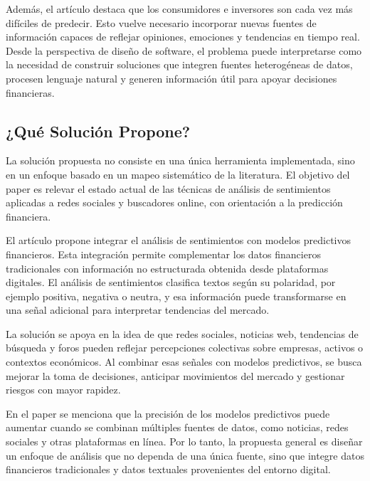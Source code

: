 \vspace{2mm}

Además, el artículo destaca que los consumidores e inversores son cada vez más difíciles de predecir. Esto vuelve necesario incorporar nuevas fuentes de información capaces de reflejar opiniones, emociones y tendencias en tiempo real. Desde la perspectiva de diseño de software, el problema puede interpretarse como la necesidad de construir soluciones que integren fuentes heterogéneas de datos, procesen lenguaje natural y generen información útil para apoyar decisiones financieras.


\subsection{¿Qué Solución Propone?}
\vspace{2mm}

La solución propuesta no consiste en una única herramienta implementada, sino en un enfoque basado en un mapeo sistemático de la literatura. El objetivo del paper es relevar el estado actual de las técnicas de análisis de sentimientos aplicadas a redes sociales y buscadores online, con orientación a la predicción financiera.

\vspace{2mm}

El artículo propone integrar el análisis de sentimientos con modelos predictivos financieros. Esta integración permite complementar los datos financieros tradicionales con información no estructurada obtenida desde plataformas digitales. El análisis de sentimientos clasifica textos según su polaridad, por ejemplo positiva, negativa o neutra, y esa información puede transformarse en una señal adicional para interpretar tendencias del mercado.

\vspace{2mm}

La solución se apoya en la idea de que redes sociales, noticias web, tendencias de búsqueda y foros pueden reflejar percepciones colectivas sobre empresas, activos o contextos económicos. Al combinar esas señales con modelos predictivos, se busca mejorar la toma de decisiones, anticipar movimientos del mercado y gestionar riesgos con mayor rapidez.

\vspace{2mm}

En el paper se menciona que la precisión de los modelos predictivos puede aumentar cuando se combinan múltiples fuentes de datos, como noticias, redes sociales y otras plataformas en línea. Por lo tanto, la propuesta general es diseñar un enfoque de análisis que no dependa de una única fuente, sino que integre datos financieros tradicionales y datos textuales provenientes del entorno digital.


